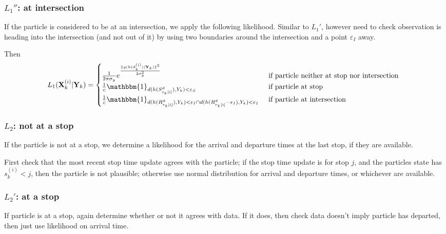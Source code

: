 \documentclass{IEEEtran}\usepackage[]{graphicx}\usepackage[]{color}
\begin{document}
\subsubsection[L1c]{$L_1''$: at intersection}

If the particle is considered to be at an intersection, we apply the following likelihood.
Similar to $L_1'$, however need to check observation is heading into the intersection
(and not out of it) by using two boundaries around the intersection and a point $\varepsilon_I$ away.


Then 
\begin{equation}
  L_1(\bX_k^{(i)} | \bY_k) =
  \begin{cases}
    \frac{1}{2\pi\sigma_y} e^{\frac{\|g(h(d_k^{(i)})|\bY_k)\|^2}{2\sigma_y^2}} & \text{ if particle neither at stop nor intersection } \\
    \frac{1}{c} \mathbbm{1}_{d(h(S_{s_k{[i]}}^d), Y_k) < \varepsilon_S}    & \text{ if particle at stop } \\
    \frac{1}{c} \mathbbm{1}_{d(h(R_{r_k{[i]}}^d), Y_k) < \varepsilon_I \cap d(h(R_{r_k{[i]}}^d-\varepsilon_I), Y_k) < \varepsilon_I}    & \text{ if particle at intersection }
  \end{cases}
\end{equation}


\subsubsection[L2]{$L_2$: not at a stop}

If the particle is not at a stop, we determine a likelihood for the arrival and departure
times at the last stop, if they are available.

First check that the most recent stop time update agrees with the particle;
if the stop time update is for stop $j$, and the particles state has $s_k^{(i)} < j$,
then the particle is not plausible;
otherwise use normal distribution for arrival and departure times,
or whichever are available.


\subsubsection[L2b]{$L_2'$: at a stop}

If particle is at a stop, again determine whether or not it agrees with data.
If it does, then check data doesn't imply particle has departed,
then just use likelihood on arrival time.
\end{document}
